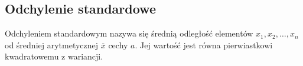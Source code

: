 \documentclass[14pt,a4paper]{extarticle}
\begin{document}
\subsection{Odchylenie standardowe}
Odchyleniem standardowym nazywa się średnią odległość elementów $x_{1}, x_{2}, \ldots, x_{n}$ od
średniej arytmetycznej $\overline{x}$ cechy $a$. Jej wartość jest równa pierwiastkowi kwadratowemu
z wariancji.










\end{document}
